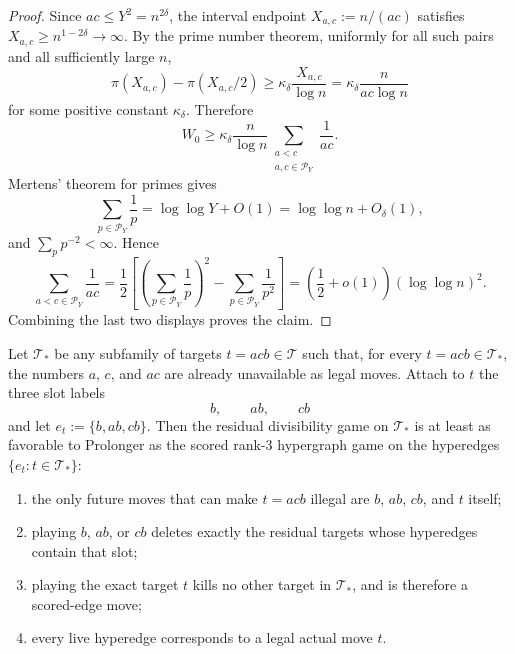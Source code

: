 \begin{proof}
Since $ac\le Y^2=n^{2\delta}$, the interval endpoint
$X_{a,c}:=n/(ac)$ satisfies $X_{a,c}\ge n^{1-2\delta}\to\infty$.  By the prime
number theorem, uniformly for all such pairs and all sufficiently large $n$,
\[
  \pi(X_{a,c})-\pi(X_{a,c}/2)
  \ge
  \kappa_\delta \frac{X_{a,c}}{\log n}
  =
  \kappa_\delta \frac{n}{ac\log n}
\]
for some positive constant $\kappa_\delta$.  Therefore
\[
  W_0
  \ge
  \kappa_\delta\frac{n}{\log n}
  \sum_{\substack{a<c\\a,c\in\mathcal P_Y}}\frac1{ac}.
\]
Mertens' theorem for primes gives
\[
  \sum_{p\in\mathcal P_Y}\frac1p
  =
  \log\log Y+O(1)
  =
  \log\log n+O_\delta(1),
\]
and $\sum_p p^{-2}<\infty$.  Hence
\[
  \sum_{a<c\in\mathcal P_Y}\frac1{ac}
  =
  \frac12\left[
    \left(\sum_{p\in\mathcal P_Y}\frac1p\right)^2
    -
    \sum_{p\in\mathcal P_Y}\frac1{p^2}
  \right]
  =
  \left(\frac12+o(1)\right)(\log\log n)^2.
\]
Combining the last two displays proves the claim.
\end{proof}

\begin{proposition}\label{prop:t2-residual-embedding}
Let $\mathcal T_*$ be any subfamily of targets $t=acb\in\mathcal T$ such that,
for every $t=acb\in\mathcal T_*$, the numbers $a$, $c$, and $ac$ are already
unavailable as legal moves.  Attach to $t$ the three slot labels
\[
  b,\qquad ab,\qquad cb
\]
and let $e_t:=\{b,ab,cb\}$.  Then the residual divisibility game on
$\mathcal T_*$ is at least as favorable to Prolonger as the scored rank-$3$
hypergraph game on the hyperedges $\{e_t:t\in\mathcal T_*\}$:
\begin{enumerate}
  \item the only future moves that can make $t=acb$ illegal are
    $b$, $ab$, $cb$, and $t$ itself;
  \item playing $b$, $ab$, or $cb$ deletes exactly the residual targets whose
    hyperedges contain that slot;
  \item playing the exact target $t$ kills no other target in $\mathcal T_*$,
    and is therefore a scored-edge move;
  \item every live hyperedge corresponds to a legal actual move $t$.
\end{enumerate}
\end{proposition}

